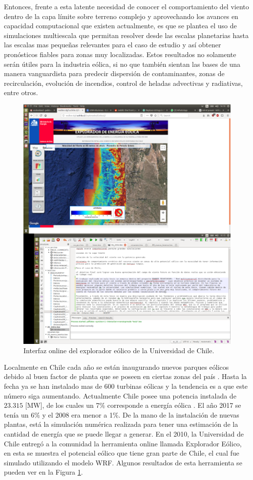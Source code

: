 Entonces, frente a esta latente necesidad de conocer el comportamiento del viento dentro de la capa límite sobre terreno complejo y aprovechando los avances en capacidad computacional que existen actualmente, es que se plantea el uso de simulaciones multiescala que permitan resolver desde las escalas planetarias hasta las escalas mas pequeñas relevantes para el caso de estudio y así obtener pronósticos fiables para zonas muy localizadas. Estos resultados no solamente serán útiles para la industria eólica, si no que también sientan las bases de una manera vanguardista para predecir dispersión de contaminantes, zonas de recirculación, evolución de incendios, control de heladas advectivas y radiativas, entre otros.

\begin{figure}[h]
	\centering
	\includegraphics[width=0.9\linewidth,trim={1.4cm 28cm 15cm 3.4cm},clip]{Imagenes/01/explo}
	\caption{Interfaz online del explorador eólico de la Universidad de Chile.}
	\label{fig:01_explorador}
\end{figure}

Localmente en Chile cada año se están inaugurando nuevos parques eólicos debido al buen factor de planta que se poseen en ciertas zonas del país \citep{anuariocne2018}. Hasta la fecha ya se han instalado mas de 600 turbinas eólicas y la tendencia es a que este número siga aumentando. Actualmente Chile posee una potencia instalada de $23.315$ [MW], de los cuales un 7\% corresponde a energía eólica \citep{anuariocne2018}. El año 2017 se tenía un 6\% y el 2008 era menor a 1\%. De la mano de la instalación de nuevas plantas, está la simulación numérica realizada para tener una estimación de la cantidad de energía que se puede llegar a generar. En el 2010, la Universidad de Chile entregó a la comunidad la herramienta online llamada Explorador Eólico, en esta se muestra el potencial eólico que tiene gran parte de Chile, el cual fue simulado utilizando el modelo WRF. Algunos resultados de esta herramienta se pueden ver en la Figura \ref{fig:01_explorador}.

